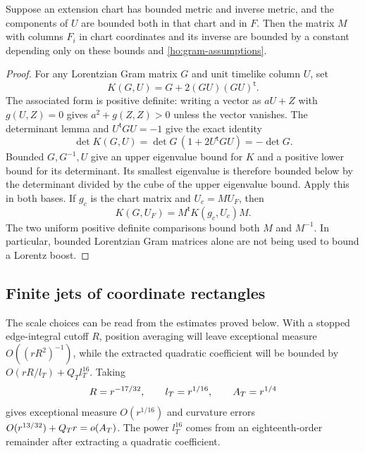 \begin{lemma}\label{ho:base-comparison}
Suppose an extension chart has bounded metric and inverse metric, and
the components of $U$ are bounded both in that chart and in $F$.
Then the matrix $M$ with columns $F_i$ in chart coordinates and its
inverse are bounded by a constant depending only on these bounds and
\eqref{ho:gram-assumptions}.
\end{lemma}

\begin{proof}
For any Lorentzian Gram matrix $G$ and unit timelike column $U$, set
\[
                 K(G,U)=G+2(GU)(GU)^{\mathsf t}.
\]
The associated form is positive definite: writing a vector as
$aU+Z$ with $g(U,Z)=0$ gives $a^2+g(Z,Z)>0$ unless the vector vanishes.
The determinant lemma and $U^{\mathsf t}GU=-1$ give the exact identity
\begin{equation}\label{ho:positive-determinant}
       \det K(G,U)=\det G\,(1+2U^{\mathsf t}GU)=-\det G.
\end{equation}
Bounded $G,G^{-1},U$ give an upper eigenvalue bound for $K$ and a
positive lower bound for its determinant.  Its smallest eigenvalue is
therefore bounded below by the determinant divided by the cube of the
upper eigenvalue bound.  Apply this in both bases.  If $g_c$ is the
chart matrix and $U_c=MU_F$, then
\[
 K(G,U_F)=M^{\mathsf t}K(g_c,U_c)M.
\]
The two uniform positive definite comparisons bound both $M$ and
$M^{-1}$.  In particular, bounded Lorentzian Gram matrices alone are
not being used to bound a Lorentz boost.
\end{proof}

\subsection{Finite jets of coordinate rectangles}

The scale choices can be read from the estimates proved below. With a
stopped edge-integral cutoff $R$, position averaging will leave
exceptional measure $O((rR^2)^{-1})$, while the extracted quadratic
coefficient will be bounded by
$O(rR/l_T)+Q_Tl_T^{16}$. Taking
\[
 R=r^{-17/32},\qquad l_T=r^{1/16},\qquad A_T=r^{1/4}
\]
gives exceptional measure $O(r^{1/16})$ and curvature errors
$O(r^{13/32})+Q_Tr=o(A_T)$. The power $l_T^{16}$ comes from an
eighteenth-order remainder after extracting a quadratic coefficient.

